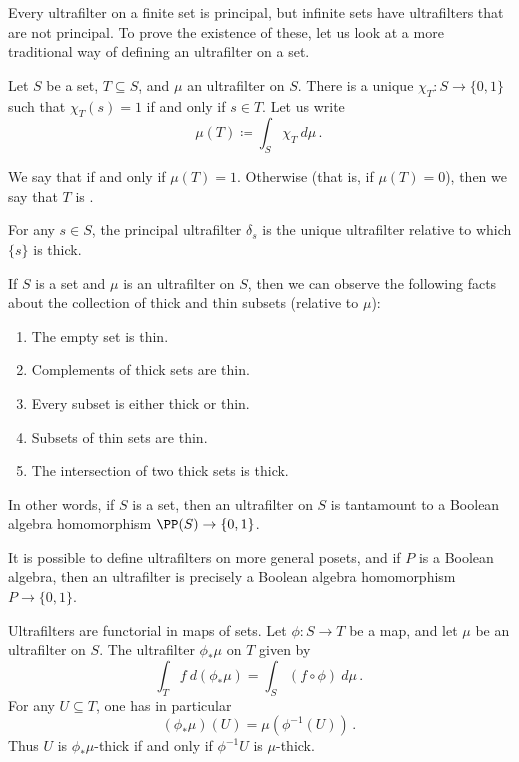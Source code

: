Every ultrafilter on a finite set is principal,
but infinite sets have ultrafilters that are not principal.
To prove the existence of these, let us look at a more traditional way of defining an ultrafilter on a set.

\begin{definition}
	Let $ S $ be a set, $ T \subseteq S$, and $ \mu $ an ultrafilter on $ S $.
	There is a unique  $ \chi_T \colon S \to \{ 0,1 \}$ such that $ \chi_T(s) = 1 $ if and only if $ s \in T $.
	Let us write
	\[
		\mu(T) \coloneq \int_S \chi_T \ d \mu \period
	\]
	
	We say that  if and only if $\mu(T) = 1$.
	Otherwise (that is, if $ \mu(T) = 0 $), then we say that $ T $ is .

	For any $ s \in S$, the principal ultrafilter $ \delta_s $ is the unique ultrafilter relative to which $ \{ s \} $ is thick.
\end{definition}

\begin{scholium}
	If $ S $ is a set and $ \mu $ is an ultrafilter on $ S $, then we can observe the following facts about the collection of thick and thin subsets (relative to $ \mu $):
	\begin{enumerate}
		\item The empty set is thin.
		\item Complements of thick sets are thin.
		\item Every subset is either thick or thin.
		\item Subsets of thin sets are thin.
		\item The intersection of two thick sets is thick.
	\end{enumerate}
	In other words, if $ S $ is a set, then an ultrafilter on $ S $ is tantamount to a Boolean algebra homomorphism $ \PP(S) \to \{0,1\} $.

	It is possible to define ultrafilters on more general posets, and if $ P $ is a Boolean algebra, then an ultrafilter is precisely a Boolean algebra homomorphism $ P \to \{0, 1\} $.
\end{scholium}

\begin{scholium}
	Ultrafilters are functorial in maps of sets.
	Let $ \phi \colon S \to T $ be a map, and let $ \mu $ be an ultrafilter on $ S $.
	The ultrafilter $ \phi_{\ast}\mu $ on $ T $ given by
	\[
		\int_T f \ d (\phi_{\ast}\mu) = \int_S (f \circ \phi) \ d \mu \period
	\]
	For any $ U \subseteq T$, one has in particular
	\[
		(\phi_{\ast} \mu)(U) = \mu (\phi^{-1}(U)) \period
	\]
	Thus $ U $ is $ \phi_{\ast} \mu $-thick if and only if $ \phi^{-1} U $ is $ \mu $-thick.
\end{scholium}

